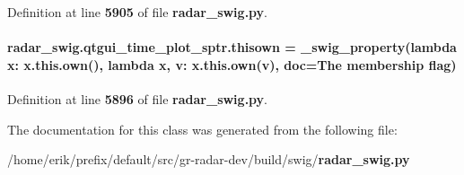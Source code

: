 Definition at line {\bf 5905} of file {\bf radar\+\_\+swig.\+py}.

\paragraph[{thisown}]{\setlength{\rightskip}{0pt plus 5cm}radar\+\_\+swig.\+qtgui\+\_\+time\+\_\+plot\+\_\+sptr.\+thisown = {\bf \+\_\+swig\+\_\+property}(lambda x\+: x.\+this.\+own(), lambda {\bf x}, v\+: x.\+this.\+own(v), doc=\textquotesingle{}The membership flag\textquotesingle{})\hspace{0.3cm}{\ttfamily [static]}}\label{classradar__swig_1_1qtgui__time__plot__sptr_a869381542510a6a970e3321ed012c963}


Definition at line {\bf 5896} of file {\bf radar\+\_\+swig.\+py}.



The documentation for this class was generated from the following file\+:\begin{DoxyCompactItemize}
\item 
/home/erik/prefix/default/src/gr-\/radar-\/dev/build/swig/{\bf radar\+\_\+swig.\+py}\end{DoxyCompactItemize}
